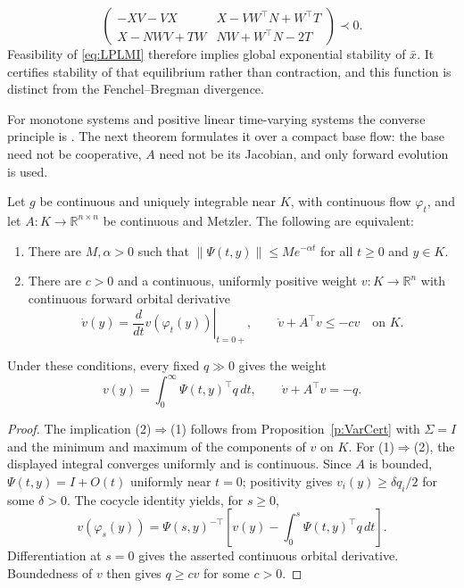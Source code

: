\begin{equation}\label{eq:LPLMI}
 \begin{pmatrix}
 -XV-VX & X-VW^\top N+W^\top T\\
 X-NWV+TW & NW+W^\top N-2T
 \end{pmatrix}\prec0.
\end{equation}
Feasibility of \eqref{eq:LPLMI} therefore implies global exponential stability of $\bar x$. It
certifies stability of that equilibrium rather than contraction, and this function is distinct
from the Fenchel--Bregman divergence.
\eeR

For monotone systems and positive linear time-varying systems the converse principle is
\cite[Theorem~4.3, Corollary~4.8]{KawanoBesselinkCao2020}. The next theorem formulates it over a
compact base flow: the base need not be cooperative, $A$ need not be its Jacobian, and only
forward evolution is used.

\label{t:SCM-converse}
Let $g$ be continuous and uniquely integrable near $K$, with continuous
flow $\varphi_t$, and let $A:K\to\mathbb R^{n\times n}$ be continuous and
Metzler. The following are equivalent:
\begin{enumerate}
\item There are $M,\alpha>0$ such that
$\|\Psi(t,y)\|\le Me^{-\alpha t}$ for all $t\ge0$ and $y\in K$.
\item There are $c>0$ and a continuous, uniformly positive weight
$v:K\to\mathbb R^n$ with continuous forward orbital derivative
\[
 \dot v(y)=\left.\frac{d}{dt}v(\varphi_t(y))\right|_{t=0+},
 \qquad \dot v+A^\top v\le-cv\quad\text{on }K.
\]
\end{enumerate}
Under these conditions, every fixed $q\gg0$ gives the weight
\[
 v(y)=\int_0^\infty\Psi(t,y)^\top q\,dt,
 \qquad \dot v+A^\top v=-q.
\]
\eeT
\begin{proof}
The implication (2)$\Rightarrow$(1) follows from
Proposition~\ref{p:VarCert} with $\Sigma=I$ and the minimum and maximum
of the components of $v$ on $K$.
For (1)$\Rightarrow$(2), the displayed integral converges uniformly and
is continuous. Since $A$ is bounded, $\Psi(t,y)=I+O(t)$ uniformly near
$t=0$; positivity gives $v_i(y)\ge\delta q_i/2$ for some $\delta>0$.
The cocycle identity yields, for $s\ge0$,
\[
 v(\varphi_s(y))=
 \Psi(s,y)^{-\top}\left[v(y)-\int_0^s\Psi(t,y)^\top q\,dt\right].
\]
Differentiation at $s=0$ gives the asserted continuous orbital derivative.
Boundedness of $v$ then gives $q\ge cv$ for some $c>0$.
\end{proof}

